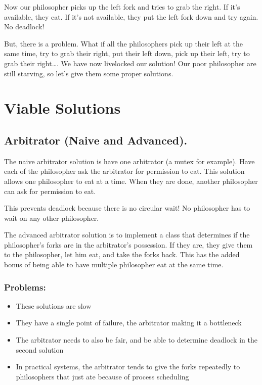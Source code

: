 Now our philosopher picks up the left fork and tries to grab the right.
If it's available, they eat. If it's not available, they put the left
fork down and try again. No deadlock!

But, there is a problem. What if all the philosophers pick up their left
at the same time, try to grab their right, put their left down, pick up
their left, try to grab their right\ldots{}. We have now livelocked our
solution! Our poor philosopher are still starving, so let's give them
some proper solutions.

\section{Viable Solutions}\label{viable-solutions}

\subsection{Arbitrator (Naive and
Advanced).}\label{arbitrator-naive-and-advanced.}

The naive arbitrator solution is have one arbitrator (a mutex for
example). Have each of the philosopher ask the arbitrator for permission
to eat. This solution allows one philosopher to eat at a time. When they
are done, another philosopher can ask for permission to eat.

This prevents deadlock because there is no circular wait! No philosopher
has to wait on any other philosopher.

The advanced arbitrator solution is to implement a class that determines
if the philosopher's forks are in the arbitrator's possession. If they
are, they give them to the philosopher, let him eat, and take the forks
back. This has the added bonus of being able to have multiple
philosopher eat at the same time.

\subsubsection{Problems:}\label{problems}

\begin{itemize}
\tightlist
\item
  These solutions are slow
\item
  They have a single point of failure, the arbitrator making it a
  bottleneck
\item
  The arbitrator needs to also be fair, and be able to determine
  deadlock in the second solution
\item
  In practical systems, the arbitrator tends to give the forks
  repeatedly to philosophers that just ate because of process scheduling
\end{itemize}


